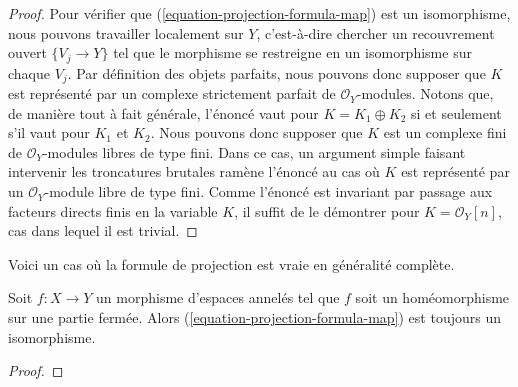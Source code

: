 {\begin{proof}
Pour vérifier que (\ref{equation-projection-formula-map}) est un isomorphisme, nous pouvons travailler localement sur $Y$, c'est-à-dire chercher un recouvrement ouvert
$\{V_j \to Y\}$
tel que le morphisme se restreigne en un isomorphisme sur chaque $V_j$. Par définition des objets parfaits, nous pouvons donc supposer que $K$ est représenté par un complexe strictement parfait de $\mathcal{O}_Y$-modules. Notons que, de manière tout à fait générale, l'énoncé vaut pour
$K = K_1 \oplus K_2$ si et seulement s'il vaut pour
$K_1$ et $K_2$. Nous pouvons donc supposer que $K$ est un complexe fini de $\mathcal{O}_Y$-modules libres de type fini. Dans ce cas, un argument simple faisant intervenir les troncatures brutales ramène l'énoncé au cas où $K$ est représenté par un $\mathcal{O}_Y$-module libre de type fini. Comme l'énoncé est invariant par passage aux facteurs directs finis en la variable $K$, il suffit de le démontrer pour $K = \mathcal{O}_Y[n]$,
cas dans lequel il est trivial.

\end{proof}

\noindent
Voici un cas où la formule de projection est vraie en généralité complète.

\begin{lemma}

\label{lemma-projection-formula-closed-immersion}
Soit $f : X \to Y$ un morphisme d'espaces annelés tel que $f$ soit un homéomorphisme sur une partie fermée. Alors (\ref{equation-projection-formula-map}) est toujours un isomorphisme.
\end{lemma}

\begin{proof}


\end{proof}}
